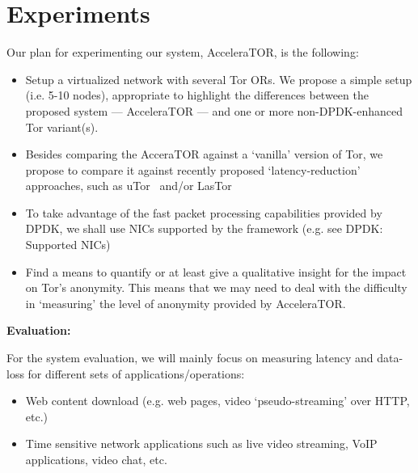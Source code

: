 \section{Experiments}
\label{sec:experiments}

Our plan for experimenting our system, AcceleraTOR, is the following:
\begin{itemize}
	
	\item Setup a virtualized network with several Tor ORs. We propose a simple setup (i.e. 5-10 nodes), appropriate to highlight the differences between the proposed system --- AcceleraTOR --- and one or more non-DPDK-enhanced Tor variant(s).

	\item Besides comparing the AcceraTOR against a `vanilla' version of Tor, we propose to compare it against recently proposed `latency-reduction' approaches, such as uTor~\cite{179191} and/or LasTor~\cite{Akhoondi:2012:LLA:2310656.2310712}

	\item To take advantage of the fast packet processing capabilities provided by DPDK, we shall use NICs supported by the framework (e.g. see DPDK: Supported NICs)

	\item Find a means to quantify or at least give a qualitative insight for the impact on Tor's anonymity. This means that we may need to deal with the difficulty in `measuring' the level of anonymity provided by AcceleraTOR. 

\end{itemize}

\textbf{Evaluation:}

For the system evaluation, we will mainly focus on measuring latency and data-loss for different sets of applications\slash operations:

\begin{itemize}

	\item Web content download (e.g. web pages, video ‘pseudo-streaming’ over HTTP, etc.)
	\item Time sensitive network applications such as live video streaming, VoIP applications, video chat, etc.

\end{itemize}

